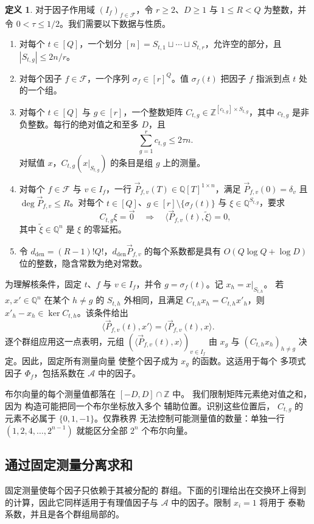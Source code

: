 \documentclass[11pt,reqno]{amsart}
\numberwithin{equation}{section}
\theoremstyle{definition}\newtheorem{definition}[theorem]{定义}
\theoremstyle{remark}\newtheorem{remark}[theorem]{注}
\renewcommand{\le}{\leqslant}
\renewcommand{\ge}{\geqslant}
\begin{document}
\begin{definition}\label{def:layout}
对于因子作用域 $(I_f)_{f\in\mathcal F}$，令 $r\ge2$、$D\ge1$ 与 $1\le R<Q$ 为整数，并令 $0<\tau\le1/2$。我们需要以下数据与性质。
\begin{enumerate}
\item 对每个 $t\in[Q]$，一个划分
$[n]=S_{t,1}\sqcup\cdots\sqcup S_{t,r}$，允许空的部分，且 $|S_{t,g}|\le2n/r$。
\item 对每个因子 $f\in\mathcal F$，一个序列
$\sigma_f\in[r]^Q$。值 $\sigma_f(t)$ 把因子 $f$ 指派到点 $t$ 处的一个组。
\item 对每个 $t\in[Q]$ 与 $g\in[r]$，一个整数矩阵
$C_{t,g}\in\mathbb Z^{[c_{t,g}]\times S_{t,g}}$，其中 $c_{t,g}$ 是非负整数。每行的绝对值之和至多 $D$，且
\[
 \sum_{g=1}^r c_{t,g}\le2\tau n.
\]
对赋值 $x$，$C_{t,g}(x|_{S_{t,g}})$ 的条目是组 $g$ 上的测量。
\item 对每个 $f\in\mathcal F$ 与 $v\in I_f$，一行
$\vec{P}_{f,v}(T)\in\mathbb Q[T]^{1\times n}$，满足
$\vec{P}_{f,v}(0)=\delta_v$ 且 $\deg \vec{P}_{f,v}\le R$。对每个 $t\in[Q]$、$g\in[r]\setminus\{\sigma_f(t)\}$ 与
$\xi\in\mathbb Q^{S_{t,g}}$，要求
\[
 C_{t,g}\xi=\vec{0}\quad\Longrightarrow\quad
 \langle \vec{P}_{f,v}(t), \widetilde\xi\rangle=0,
\]
其中 $\widetilde\xi\in\mathbb Q^n$ 是 $\xi$ 的零延拓。
\item 令 $d_{\mathrm{den}}=(R-1)!Q!$，$d_{\mathrm{den}} \vec{P}_{f,v}$ 的每个系数都是具有 $O(Q\log Q+\log D)$ 位的整数，隐含常数为绝对常数。
\end{enumerate}
\end{definition}
为理解核条件，固定 $t$、$f$ 与 $v\in I_f$，并令 $g=\sigma_f(t)$。记 $x_h=x|_{S_{t,h}}$。
若 $x,x'\in\mathbb Q^n$ 在某个 $h\ne g$ 的 $S_{t,h}$ 外相同，且满足 $C_{t,h}x_h=C_{t,h}x'_h$，则
$x'_h-x_h\in\ker C_{t,h}$。该条件给出
\[
 \langle \vec{P}_{f,v}(t), x'\rangle=\langle \vec{P}_{f,v}(t), x\rangle.
\]
逐个群组应用这一点表明，元组
$(\langle \vec{P}_{f,v}(t), x\rangle)_{v\in I_f}$ 由 $x_g$ 与
$(C_{t,h}x_h)_{h\ne g}$ 决定。因此，固定所有测量向量
使整个因子成为 $x_g$ 的函数。这适用于每个
多项式因子 $\Phi_f$，包括系数在
$\mathcal A$ 中的因子。

布尔向量的每个测量值都落在 $[-D,D]\cap\mathbb Z$ 中。
我们限制矩阵元素绝对值之和，因为
构造可能把同一个布尔坐标放入多个
辅助位置。识别这些位置后，
$C_{t,g}$ 的元素不必属于 $\{0,1,-1\}$。仅靠秩界
无法控制可能测量值的数量：单独一行
$(1,2,4,\ldots,2^{n-1})$ 就能区分全部 $2^n$ 个布尔向量。

\subsection{通过固定测量分离求和}
\label{subsec:measurement-factorization}
固定测量使每个因子只依赖于其被分配的
群组。下面的引理给出在交换环上得到的计算，因此它同样适用于有理值因子与
$\mathcal A$ 中的因子。限制 $x_i=1$ 将用于
泰勒系数，并且是各个群组局部的。
\end{document}
